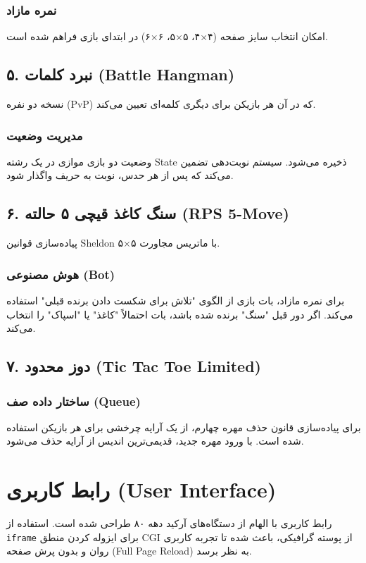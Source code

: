 \documentclass[12pt, a4paper]{article}
\begin{document}
\subsubsection{نمره مازاد}
امکان انتخاب سایز صفحه (۴×۴، ۵×۵، ۶×۶) در ابتدای بازی فراهم شده است.

\subsection{۵. نبرد کلمات (Battle Hangman)}
نسخه دو نفره (PvP) که در آن هر بازیکن برای دیگری کلمه‌ای تعیین می‌کند.
\subsubsection{مدیریت وضعیت}
وضعیت دو بازی موازی در یک رشته State ذخیره می‌شود. سیستم نوبت‌دهی تضمین می‌کند که پس از هر حدس، نوبت به حریف واگذار شود.

\subsection{۶. سنگ کاغذ قیچی ۵ حالته (RPS 5-Move)}
پیاده‌سازی قوانین Sheldon با ماتریس مجاورت ۵×۵.
\subsubsection{هوش مصنوعی (Bot)}
برای نمره مازاد، بات بازی از الگوی "تلاش برای شکست دادن برنده قبلی" استفاده می‌کند. اگر دور قبل "سنگ" برنده شده باشد، بات احتمالاً "کاغذ" یا "اسپاک" را انتخاب می‌کند.

\subsection{۷. دوز محدود (Tic Tac Toe Limited)}
\subsubsection{ساختار داده صف (Queue)}
برای پیاده‌سازی قانون حذف مهره چهارم، از یک آرایه چرخشی برای هر بازیکن استفاده شده است. با ورود مهره جدید، قدیمی‌ترین اندیس از آرایه حذف می‌شود.

\section{رابط کاربری (User Interface)}
رابط کاربری با الهام از دستگاه‌های آرکید دهه ۸۰ طراحی شده است. استفاده از \texttt{iframe} برای ایزوله کردن منطق CGI از پوسته گرافیکی، باعث شده تا تجربه کاربری روان و بدون پرش صفحه (Full Page Reload) به نظر برسد.
\end{document}
